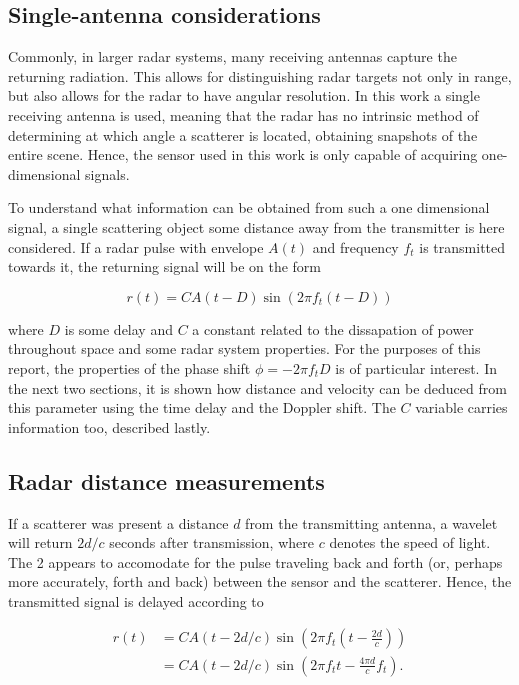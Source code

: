 \subsection{Single-antenna considerations}

Commonly, in larger radar systems, many receiving antennas capture the returning radiation. This allows for distinguishing radar targets not only in range, but also allows for the radar to have angular resolution. In this work a single receiving antenna is used, meaning that the radar has no intrinsic method of determining at which angle a scatterer is located, obtaining snapshots of the entire scene. Hence, the sensor used in this work is only capable of acquiring one-dimensional signals. 

To understand what information can be obtained from such a one dimensional signal, a single scattering object some distance away from the transmitter is here considered. If a radar pulse with envelope $A(t)$ and frequency $f_t$ is transmitted towards it, the returning signal will be on the form \citep{richards_2014}

\begin{equation}\label{eq:returning}
	r(t) = CA(t-D)\sin(2\pi f_t (t-D))
\end{equation}

where $D$ is some delay and $C$ a constant related to the dissapation of power throughout space and some radar system properties. For the purposes of this report, the properties of the phase shift $\phi=-2\pi f_tD$ is of particular interest. In the next two sections, it is shown how distance and velocity can be deduced from this parameter using the time delay and the Doppler shift. The $C$ variable carries information too, described lastly. 

\subsection{Radar distance measurements}

If a scatterer was present a distance $d$ from the transmitting antenna, a wavelet will return $2d/c$ seconds after transmission, where $c$ denotes the speed of light. The 2 appears to accomodate for the pulse traveling back and forth (or, perhaps more accurately, forth and back) between the sensor and the scatterer. Hence, the transmitted signal is delayed according to 

\begin{equation}
	\begin{split}
		r(t) 
		& = CA(t-2d/c)\sin(2\pi f_t(t - \frac{2d}{c})) \\
		& = CA(t-2d/c)\sin(2\pi f_tt - \frac{4\pi d}{c}f_t).
	\end{split}
\end{equation}

